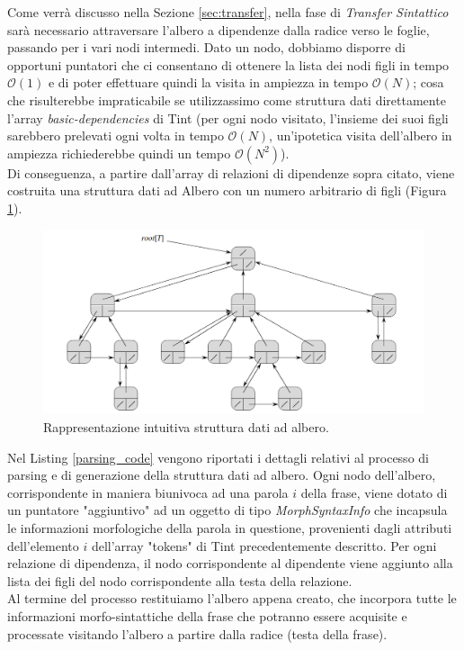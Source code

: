Come verrà discusso nella Sezione {\ref{sec:transfer}}, nella fase di \textit{Transfer Sintattico} sarà necessario attraversare l'albero a dipendenze dalla radice verso le foglie, passando per i vari nodi intermedi.
Dato un nodo, dobbiamo disporre di opportuni puntatori che ci consentano di ottenere la lista dei nodi figli in tempo $\mathcal{O}(1)$ e di poter effettuare quindi la visita in ampiezza in tempo $\mathcal{O}(N)$;  cosa che risulterebbe impraticabile se utilizzassimo come struttura dati direttamente l'array \textit{basic-dependencies} di Tint (per ogni nodo visitato, l'insieme dei suoi figli sarebbero prelevati ogni volta in tempo $\mathcal{O}(N)$, un'ipotetica visita dell'albero in ampiezza richiederebbe quindi un tempo $\mathcal{O}(N^2)$). \\
Di conseguenza, a partire dall'array di relazioni di dipendenze sopra citato, viene costruita una struttura dati ad Albero con un numero arbitrario di figli (Figura \ref{tree}).
\begin{figure}[ht]
	\centering 
	\includegraphics[scale=0.35]{./img/Albero}
	\caption{Rappresentazione intuitiva struttura dati ad albero.}
	\label{tree}
\end{figure}

Nel Listing \ref{parsing_code} vengono riportati i dettagli relativi al processo di parsing e di generazione della struttura dati ad albero.
Ogni nodo dell'albero, corrispondente in maniera biunivoca ad una parola $i$ della frase, viene dotato di un puntatore "aggiuntivo" ad un oggetto di tipo \textit{MorphSyntaxInfo} che incapsula le informazioni morfologiche della parola in questione, provenienti dagli attributi dell'elemento $i$ dell'array "tokens" di Tint precedentemente descritto. 
Per ogni relazione di dipendenza, il nodo corrispondente al dipendente viene aggiunto alla lista dei figli del nodo corrispondente alla testa della relazione. \\
Al termine del processo restituiamo l'albero appena creato, che incorpora tutte le informazioni morfo-sintattiche della frase che potranno essere acquisite e processate visitando l'albero 
a partire dalla radice (testa della frase).



